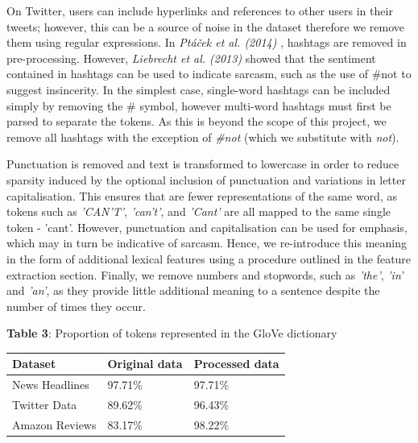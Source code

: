 \documentclass[12pt,a4paper]{article}
\begin{document}
On Twitter, users can include hyperlinks and references to other users in their tweets; however, this can be a source of noise in the dataset therefore we remove them using regular expressions. In \textit{Pt{\'a}{\v{c}ek et al. (2014)}} \cite{ptavcek2014sarcasm}, hashtags are removed in pre-processing. However, \textit{Liebrecht et al. (2013)} \cite{liebrecht2013perfect} showed that the sentiment contained in hashtags can be used to indicate sarcasm, such as the use of \#not to suggest insincerity. In the simplest case, single-word hashtags can be included simply by removing the \# symbol, however multi-word hashtags must first be parsed to separate the tokens. As this is beyond the scope of this project, we remove all hashtags with the exception of \textit{\#not} (which we substitute with \textit{not}).

Punctuation is removed and text is transformed to lowercase in order to reduce sparsity induced by the optional inclusion of punctuation and variations in letter capitalisation. This ensures that are fewer representations of the same word, as tokens such as \textit{'CAN'T'}, \textit{'can't'}, and \textit{'Cant'} are all mapped to the same single token - 'cant'. However, punctuation and capitalisation can be used for emphasis, which may in turn be indicative of sarcasm. Hence, we re-introduce this meaning in the form of additional lexical features using a procedure outlined in the feature extraction section. Finally, we remove numbers and stopwords, such as \textit{'the'}, \textit{'in'} and \textit{'an'}, as they provide little additional meaning to a sentence despite the number of times they occur.

\begin{center}
	\textbf{Table 3}:  Proportion of tokens represented in the GloVe dictionary\\
	\vspace{4pt}
	\begin{tabular}{p{3cm}||p{3cm}p{3cm}}
		\hline
		\textbf{Dataset} & \textbf{Original data} & \textbf{Processed data}\\
		\hline
		News Headlines & \hspace{20pt}97.71\% & \hspace{20pt}97.71\%\\
		\hline
		Twitter Data & \hspace{20pt}89.62\% & \hspace{20pt}96.43\%\\
		\hline
		Amazon Reviews & \hspace{20pt}83.17\% & \hspace{20pt}98.22\%\\
		\hline
	\end{tabular}\\
\end{center}
\end{document}

